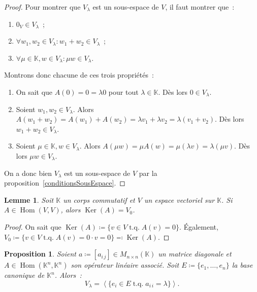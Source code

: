 \documentclass{article}
\DeclareMathOperator{\tq}{\text{ t.q. }}
\DeclareMathOperator{\Ker}{Ker}
\DeclareMathOperator{\Hom}{Hom}
\newcommand{\K}{\mathbb K}
\newcommand{\eng}[1]{\left\langle#1\right\rangle}
\newcommand{\M}[3]{M_{#1 \times #2}(#3)}
\newtheorem{prp}[thm]{Proposition}
\newtheorem{lem}[thm]{Lemme}
\theoremstyle{definition}
\theoremstyle{remark}
\begin{document}
		\begin{proof} Pour montrer que $V_\lambda$ est un sous-espace de $V$, il faut montrer que~:
		\begin{enumerate}
			\item $0_V \in V_\lambda$~;
			\item $\forall w_1, w_2 \in V_\lambda : w_1 + w_2 \in V_\lambda$~;
			\item $\forall \mu \in \K, w \in V_\lambda : \mu w \in V_\lambda$.
		\end{enumerate}

		Montrons donc chacune de ces trois propriétés~:
		\begin{enumerate}
			\item On sait que $A(0) = 0 = \lambda 0$ pour tout $\lambda \in \K$. Dès lors $0 \in V_\lambda$.
			\item Soient $w_1, w_2 \in V_\lambda$. Alors $A(w_1 + w_2) = A(w_1) + A(w_2) = \lambda v_1 + \lambda v_2 = \lambda(v_1 + v_2)$.
			      Dès lors $w_1+w_2 \in V_\lambda$.
			\item Soient $\mu \in \K, w \in V_\lambda$. Alors $A(\mu w) = \mu A(w) = \mu (\lambda v) = \lambda(\mu v)$. Dès lors $\mu w \in V_\lambda$.
		\end{enumerate}

		On a donc bien $V_\lambda$ est un sous-espace de $V$ par la proposition~\ref{conditionsSousEspace}. \end{proof}

		\begin{lem} Soit $\K$ un corps commutatif et $V$ un espace vectoriel sur $\K$. Si $A \in \Hom(V, V)$, alors $\Ker(A) = V_0$. \end{lem}

		\begin{proof} On sait que $\Ker(A) \coloneqq \{v \in V \tq A(v) = 0\}$. Également, $V_0 \coloneqq \{v \in V \tq A(v) = 0 \cdot v = 0\} \eqqcolon \Ker(A)$.
		\end{proof}

		\begin{prp} Soient $a \coloneqq [a_{i\,j}] \in \M nn\K$ un matrice diagonale et $A \in \Hom(\K^n, \K^n)$ son opérateur linéaire associé.
		Soit $E \coloneqq \{e_1, \dotsc, e_n\}$ la base canonique de $\K^n$. Alors~: \[V_\lambda = \eng {\{e_i \in E \tq a_{i\,i} = \lambda\}}.\] \end{prp}
\end{document}
